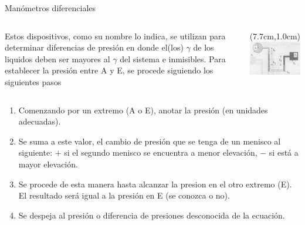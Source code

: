 \documentclass [xcolor=svgnames, t] {beamer}
\begin{document}
\begin{frame}{Man\'ometros diferenciales}
\vspace{-0.5cm}
\begin{block}{}
\begin{columns}
Estos dispositivos, como su nombre lo indica, se utilizan para determinar diferencias de presi\'on en donde el(los) $\gamma$ de los liquidos deben ser mayores al $\gamma$ del sistema e inmisibles. Para establecer la presi\'on entre A y E, se procede siguiendo los siguientes pasos
\begin{textblock*}{4.5cm}(7.7cm,1.0cm) %
\includegraphics[width=\textwidth]{manome2}
\end{textblock*}
\end{columns}
\end{block}
\begin{enumerate}
\item Comenzando por un extremo (A o E), anotar la presi\'on (en unidades adecuadas).
\item Se suma a este valor, el cambio de presi\'on que se tenga de un menisco al siguiente: $+$ si el segundo menisco se encuentra a menor elevaci\'on, $-$ si est\'a a mayor elevaci\'on.
\item Se procede de esta manera hasta alcanzar la presion en el otro extremo (E). El resultado ser\'a igual a la presi\'on en E (se conozca o no).
\item Se despeja al presi\'on o diferencia de presiones desconocida de la ecuaci\'on. 
\end{enumerate}
\end{frame}
\end{document}
